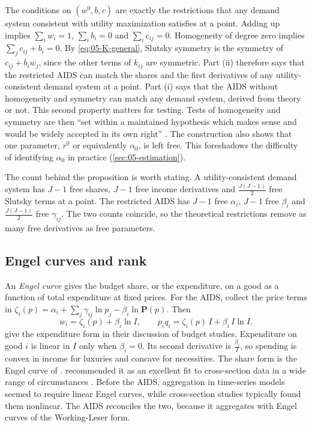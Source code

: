 The conditions on $(w^0, b, c)$ are exactly the restrictions that any demand system consistent with utility
maximization satisfies at a point. Adding up implies $\sum_iw_i = 1$, $\sum_ib_i = 0$ and $\sum_ic_{ij} = 0$.
Homogeneity of degree zero implies $\sum_jc_{ij} + b_i = 0$. By \eqref{eq:05-K-general}, Slutsky symmetry is
the symmetry of $c_{ij} + b_iw_j$, since the other terms of $k_{ij}$ are symmetric. Part (ii) therefore says
that the restricted AIDS can match the shares and the first derivatives of any utility-consistent demand
system at a point. Part (i) says that the AIDS without homogeneity and symmetry can match any demand system,
derived from theory or not. This second property matters for testing. Tests of homogeneity and symmetry are
then ``set within a maintained hypothesis which makes sense and would be widely accepted in its own right''
\citep[p.~315]{DeatonMuellbauer1980a}. The construction also shows that one parameter, $r^0$ or equivalently
$\alpha_0$, is left free. This foreshadows the difficulty of identifying $\alpha_0$ in practice
(\cref{sec:05-estimation}).

The count behind the proposition is worth stating. A utility-consistent demand system has $J - 1$ free
shares, $J - 1$ free income derivatives and $\frac{J(J-1)}{2}$ free Slutsky terms at a point. The restricted
AIDS has $J - 1$ free $\alpha_i$, $J - 1$ free $\beta_i$ and $\frac{J(J-1)}{2}$ free $\gamma_{ij}$. The two
counts coincide, so the theoretical restrictions remove as many free derivatives as free parameters.

\subsection{Engel curves and rank}\label{sec:05-engel}

An \emph{Engel curve} gives the budget share, or the expenditure, on a good as a function of total
expenditure at fixed prices. For the AIDS, collect the price terms in
$\zeta_i(p) = \alpha_i + \sum_j\gamma_{ij}\ln p_j - \beta_i\ln\mathbf{P}(p)$. Then
\begin{equation}\label{eq:05-engel}
w_i = \zeta_i(p) + \beta_i\ln I, \qquad p_iq_i = \zeta_i(p)\,I + \beta_i\,I\ln I .
\end{equation}
\citet[p.~317]{DeatonMuellbauer1980a} give the expenditure form in their discussion of budget studies.
Expenditure on good $i$ is
linear in $I$ only when $\beta_i = 0$. Its second derivative is $\frac{\beta_i}{I}$, so spending is convex in
income for luxuries and concave for necessities. The share form is the Engel curve of \citet{Working1943}.
\citet{Leser1963} recommended it as an excellent fit to cross-section data in a wide range of circumstances
\citep[p.~317]{DeatonMuellbauer1980a}. Before the AIDS, aggregation in time-series models
seemed to require linear Engel curves, while cross-section studies typically found them nonlinear. The AIDS
reconciles the two, because it aggregates with Engel curves of the Working-Leser form.

